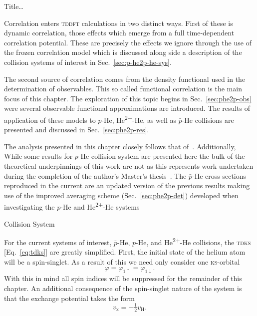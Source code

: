 \documentclass[letterpaper, 11 pt]{report}
\begin{document}
\begin{chapter}{ Title\dots \label{chap:p-he2p-he}} %

   Correlation enters \textsc{tddft} calculations in two distinct ways. First of these is dynamic
   correlation, those effects which emerge from a full time-dependent correlation potential. These are
   precisely the effects we ignore through the use of the frozen correlation model which is discussed
   along side a description of the collision systems of interest in Sec.~\ref{sec:p-he2p-he-sys}.

   The second source of correlation comes from the density functional
   used in the determination of observables. This so called functional correlation is the main focus of
   this chapter. The exploration of this topic begins in Sec.~\ref{sec:phe2p-obs} were several
   observable functional approximations are introduced. The results of application of these models to
   $p$-He, He\textsuperscript{2+}-He, as well as $\bar{p}$-He collisions are presented and discussed in
   Sec.~\ref{sec:phe2p-res}.

   The analysis presented in this chapter closely follows that of~\cite{p-he2p-he}. Additionally, While
   some results for $\bar{p}$-He collision system are presented here the bulk of the theoretical
   underpinnings of this work are not as this represents work undertaken during the completion of the
   author's Master's thesis~\cite{thesis}. The $\bar{p}$-He cross sections reproduced in the current
   are an updated version of the previous results making use of the improved averaging scheme
   (Sec.~\ref{sec:phe2p-det}) developed when investigating the $p$-He and He\textsuperscript{2+}-He
   systems

   \begin{section}{Collision System \label{sec:p-he2p-he-sys}}

      For the current systems of interest, $\bar{p}$-He, $p$-He, and He\textsuperscript{2+}-He
      collisions, the \textsc{tdks} [Eq.~\eqref{eq:tdks}] are greatly simplified. First, the initial
      state of the helium atom will be a spin-singlet. As a result of this we need only consider one
      \textsc{ks}-orbital
      \begin{equation} \label{eq:oneorb}
         \varphi = \varphi_{1\uparrow} = \varphi_{1\downarrow}.
      \end{equation}
      With this in mind all spin indices will be suppressed for the remainder of this chapter. An
      additional consequence of the spin-singlet nature of the system is that the exchange potential
      takes the form
      \begin{equation} \label{eq:vxvh}
         v_\mathrm{x} = - \tfrac{1}{2} v_\mathrm{H}.
      \end{equation}


\end{section}
\end{chapter}
\end{document}
